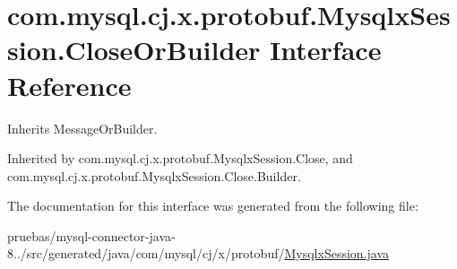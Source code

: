 \hypertarget{interfacecom_1_1mysql_1_1cj_1_1x_1_1protobuf_1_1_mysqlx_session_1_1_close_or_builder}{}\section{com.\+mysql.\+cj.\+x.\+protobuf.\+Mysqlx\+Session.\+Close\+Or\+Builder Interface Reference}
\label{interfacecom_1_1mysql_1_1cj_1_1x_1_1protobuf_1_1_mysqlx_session_1_1_close_or_builder}


Inherits Message\+Or\+Builder.



Inherited by com.\+mysql.\+cj.\+x.\+protobuf.\+Mysqlx\+Session.\+Close, and com.\+mysql.\+cj.\+x.\+protobuf.\+Mysqlx\+Session.\+Close.\+Builder.



The documentation for this interface was generated from the following file\+:\begin{DoxyCompactItemize}
\item 
pruebas/mysql-\/connector-\/java-\/8../src/generated/java/com/mysql/cj/x/protobuf/\mbox{\hyperlink{generated_2java_2com_2mysql_2cj_2x_2protobuf_2_mysqlx_session_8java}{Mysqlx\+Session.\+java}}\end{DoxyCompactItemize}
